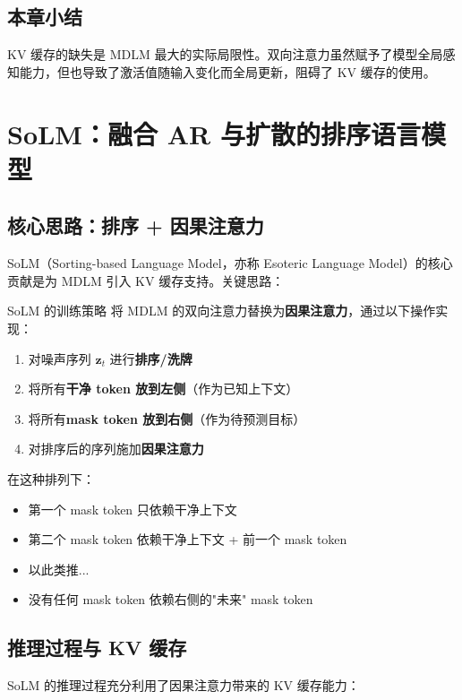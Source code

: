 \documentclass[a4paper]{article}
\begin{document}
\subsection{本章小结}

KV 缓存的缺失是 MDLM 最大的实际局限性。双向注意力虽然赋予了模型全局感知能力，但也导致了激活值随输入变化而全局更新，阻碍了 KV 缓存的使用。

\newpage
\section{SoLM：融合 AR 与扩散的排序语言模型}

\subsection{核心思路：排序 + 因果注意力}

SoLM（Sorting-based Language Model，亦称 Esoteric Language Model）的核心贡献是为 MDLM 引入 KV 缓存支持。关键思路：

\begin{importantbox}{SoLM 的训练策略}
将 MDLM 的双向注意力替换为\textbf{因果注意力}，通过以下操作实现：
\begin{enumerate}
    \item 对噪声序列 $\mathbf{z}_t$ 进行\textbf{排序/洗牌}
    \item 将所有\textbf{干净 token 放到左侧}（作为已知上下文）
    \item 将所有\textbf{mask token 放到右侧}（作为待预测目标）
    \item 对排序后的序列施加\textbf{因果注意力}
\end{enumerate}
\end{importantbox}

在这种排列下：
\begin{itemize}
    \item 第一个 mask token 只依赖干净上下文
    \item 第二个 mask token 依赖干净上下文 + 前一个 mask token
    \item 以此类推...
    \item 没有任何 mask token 依赖右侧的"未来" mask token
\end{itemize}

\subsection{推理过程与 KV 缓存}

SoLM 的推理过程充分利用了因果注意力带来的 KV 缓存能力：
\end{document}
